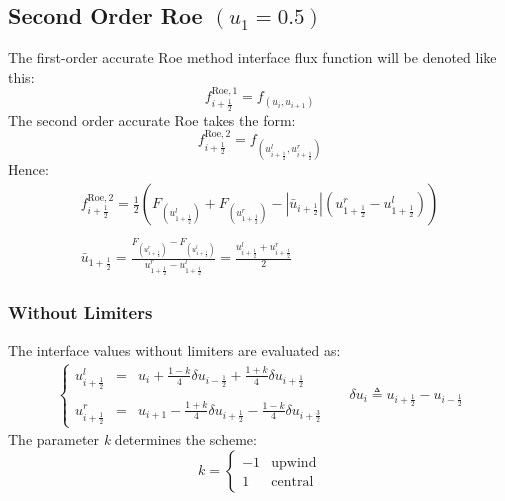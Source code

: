 \documentclass[11pt, a4paper]{article}
\begin{document}
\subsection{Second Order Roe $(u_1 = 0.5)$}
The first-order accurate Roe method interface flux function will be denoted like this:
\begin{equation*}
    f_{i+\frac{1}{2}}^{\mathrm{Roe},1}=f_{\left(u_i, u_{i+1}\right)}
\end{equation*}
The second order accurate Roe takes the form:
\begin{equation*}
    f_{i+\frac{1}{2}}^{\mathrm{Roe},2}=f_{\left(u_{i+\frac{1}{2}}^l, u_{i+\frac{1}{2}}^r\right)}
\end{equation*}
Hence:
\begin{equation}
    \begin{matrix}
        \displaystyle f_{i+\frac{1}{2}}^{\mathrm{Roe},2}=\frac{1}{2}\left(F_{\left(u_{1+\frac{1}{2}}^l\right)}+F_{\left(u_{1+\frac{1}{2}}^r\right)}-\left|\bar{u}_{i+\frac{1}{2}}\right|\left(u_{1+\frac{1}{2}}^r-u_{1+\frac{1}{2}}^l\right)\right) \\\\
        \displaystyle \bar{u}_{1+\frac{1}{2}}=\frac{F_{\left(u_{1+\frac{1}{2}}^r\right)}-F_{\left(u_{1+\frac{1}{2}}^l\right)}}{u_{1+\frac{1}{2}}^r-u_{1+\frac{1}{2}}^l} = \frac{u_{i+\frac{1}{2}}^l+u_{i+\frac{1}{2}}^r}{2}
    \end{matrix}
\end{equation}

\subsubsection{Without Limiters}
The interface values without limiters are evaluated as:
\begin{equation}
    \begin{matrix}
        \left\{\begin{array}{lcl}
            u_{i+\frac{1}{2}}^l & = & \displaystyle u_i+\frac{1-k}{4}\delta u_{i-\frac{1}{2}}+\frac{1+k}{4}\delta u_{i+\frac{1}{2}} \\\\
            u_{i+\frac{1}{2}}^r & = & \displaystyle u_{i+1}-\frac{1+k}{4}\delta u_{i+\frac{1}{2}}-\frac{1-k}{4}\delta u_{i+\frac{3}{2}}
        \end{array}\right. && \delta u_i\triangleq u_{i+\frac{1}{2}} - u_{i-\frac{1}{2}}
    \end{matrix}
\end{equation}
The parameter \emph{k} determines the scheme:
\begin{equation*}
    k = \left\{\begin{array}{cr}
        -1 & \mathrm{upwind} \\
        1 & \mathrm{central}
    \end{array}\right.
\end{equation*}
\end{document}
